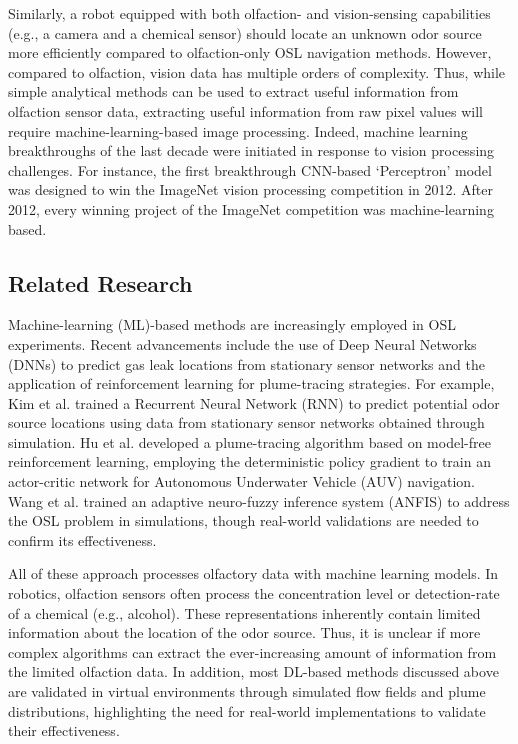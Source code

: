 Similarly, a robot equipped with both olfaction- and vision-sensing capabilities (e.g., a camera and a chemical sensor) should locate an unknown odor source more efficiently compared to olfaction-only OSL navigation methods. However, compared to olfaction, vision data has multiple orders of complexity. Thus, while simple analytical methods can be used to extract useful information from olfaction sensor data, extracting useful information from raw pixel values will require machine-learning-based image processing. Indeed, machine learning breakthroughs of the last decade were initiated in response to vision processing challenges. For instance, the first breakthrough CNN-based `Perceptron' model \cite{krizhevsky2012imagenet} was designed to win the ImageNet vision processing competition in 2012. After 2012, every winning project of the ImageNet competition was machine-learning based.

\subsection{Related Research}\label{Subsec:DLROSL}
Machine-learning (ML)-based methods are increasingly employed in OSL experiments. Recent advancements include the use of Deep Neural Networks (DNNs) to predict gas leak locations from stationary sensor networks and the application of reinforcement learning for plume-tracing strategies. For example, Kim et al. \cite{kim2019source} trained a Recurrent Neural Network (RNN) to predict potential odor source locations using data from stationary sensor networks obtained through simulation. Hu et al. \cite{hu2019plume} developed a plume-tracing algorithm based on model-free reinforcement learning, employing the deterministic policy gradient to train an actor-critic network for Autonomous Underwater Vehicle (AUV) navigation. Wang et al. \cite{wang2021implementation} trained an adaptive neuro-fuzzy inference system (ANFIS) to address the OSL problem in simulations, though real-world validations are needed to confirm its effectiveness.

All of these approach processes olfactory data with machine learning models. In robotics, olfaction sensors often process the concentration level or detection-rate of a chemical (e.g., alcohol). These representations inherently contain limited information about the location of the odor source. Thus, it is unclear if more complex algorithms can extract the ever-increasing amount of information from the limited olfaction data. In addition, most DL-based methods discussed above are validated in virtual environments through simulated flow fields and plume distributions, highlighting the need for real-world implementations to validate their effectiveness.

